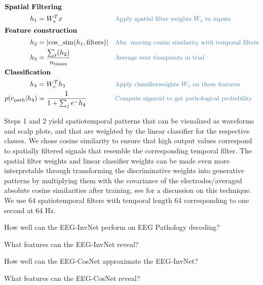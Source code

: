 \begin{align*}
    \intertext{\textbf{Spatial Filtering}}
    h_1 &= W_s^Tx && \codecomment{\text{Apply spatial filter weights } W_s \text{ to  inputs }} \\
    \intertext{\textbf{Feature construction}}
    h_2 &= |\mathrm{cos\_sim}(h_1, \mathrm{filters})| && \codecomment{\text{Abs. moving cosine similarity with temporal filters}} \\
    h_3 &=\frac{\sum_t (h_2)}{n_\mathrm{times}} && \codecomment{\text{Average over timepoints in trial}} \\
    \intertext{\textbf{Classification}}
    h_4 &= W_c^Th_3 && \codecomment{\text{Apply classifierweights } W_c \text{ on these features }} \\
p(\mathrm{c_\mathrm{path}}|h_4) &= \frac{1}{1 + \sum_j e^-h_{4}} && \codecomment{\text{Compute sigmoid to get pathological probability}} \\
\end{align*}

Steps 1 and 2 yield spatiotemporal patterns that can be visualized as
waveforms and scalp plots, and that are weighted by the linear
classifier for the respective classes. We chose cosine similarity to
ensure that high output values correspond to spatially filtered signals
that resemble the corresponding temporal filter. The spatial filter
weights and linear classifier weights can be made even more
interpretable through transforming the discriminative weights into
generative patterns by multiplying them with the covariance of the
electrodes/averaged absolute cosine similarities after training, see
\citet{haufe_interpretation_2014} for a discussion on this
technique. We use 64 spatiotemporal filters with temporal length 64
corresponding to one second at 64 Hz.


\begin{openbox}
\item How well can the EEG-InvNet perform on EEG Pathology decoding?
\item What features can the EEG-InvNet reveal?
\item How well can the EEG-CosNet approximate the EEG-InvNet?
\item What features can the EEG-CosNet reveal?
\end{openbox}
